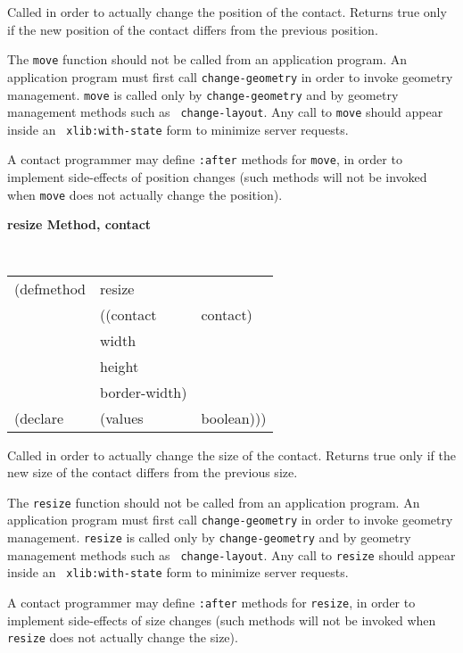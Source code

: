 \documentclass[twoside]{book}
\begin{document}
\begin{sloppy}
\begin{flushright} \parbox[t]{6.125in}{
Called in order to actually change the position of the contact.
Returns true only if the new position of the contact differs from the previous
position. 

The {\tt move} function should not be called from an application program. An
application program must first call {\tt change-geometry}  in order to invoke geometry management. {\tt move} is called only by
{\tt change-geometry} and by geometry management methods such as {\tt
change-layout}. Any call to {\tt move} should appear inside an {\tt
xlib:with-state} form to minimize server requests.

A contact programmer may define {\tt :after} methods for {\tt move}, in order to
implement side-effects of position changes (such methods will not be invoked when
{\tt move} does not actually change the position).

}\end{flushright}

{\samepage
{\large {\bf resize \hfill Method, contact}}
\begin{flushright}
\parbox[t]{6.125in}{
\tt
\begin{tabular}{lll}
\raggedright
(defmethod & resize & \\
& ((contact  &contact)\\
& width & \\
& height   \\
&border-width)\\
(declare & (values & boolean)))
\end{tabular}
\rm
}\end{flushright}
}

\begin{flushright} \parbox[t]{6.125in}{
Called in order to actually change the size of the contact.
Returns true only if the new size of the contact differs from the previous
size. 

The {\tt resize} function should not be called from an application program. An
application program must first call {\tt change-geometry}  in order to invoke geometry management. {\tt resize} is called only by
{\tt change-geometry} and by geometry management methods such as {\tt
change-layout}. Any call to {\tt resize} should appear inside an {\tt
xlib:with-state} form to minimize server requests.

A contact programmer may define {\tt :after} methods for {\tt resize}, in order to
implement side-effects of size changes (such methods will not be invoked when
{\tt resize} does not actually change the size).

}
\end{flushright}
\end{sloppy}
\end{document}
